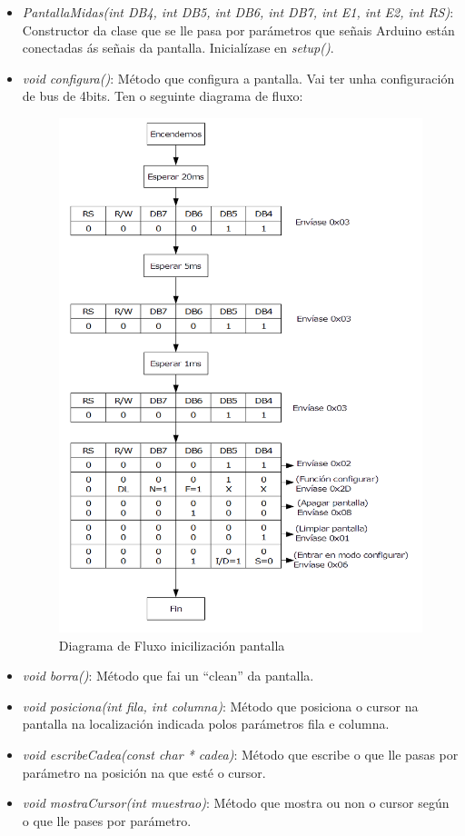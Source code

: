 \documentclass[11pt,twoside]{book}
\begin{document}
\begin{itemize}
    \item \textit{PantallaMidas(int DB4, int DB5, int DB6, int DB7, int E1, int E2, int RS)}: Constructor da clase que se lle pasa por parámetros que señais Arduino están conectadas ás señais da pantalla. Inicialízase en \textit{setup()}.
    \item \textit{void configura()}: Método que configura a pantalla. Vai ter unha configuración de bus de 4bits. Ten o seguinte diagrama de fluxo:
    \begin{figure}[H]
    	\begin{center}
    		\includegraphics[scale=0.6]{images/inicializar_lcd.png}
    	\end{center}
    	\caption{Diagrama de Fluxo inicilización pantalla}
    	\label{fig:DiagramaFlujoPantalla}
    \end{figure}
    \item \textit{void borra()}: Método que fai un ``clean'' da pantalla.
    \item \textit{void posiciona(int fila, int columna)}: Método que posiciona o cursor na pantalla na localización indicada polos parámetros fila e columna.
    \item \textit{ void escribeCadea(const char * cadea)}: Método que escribe o que lle pasas por parámetro na posición na que esté o cursor.
    \item \textit{void mostraCursor(int muestrao)}: Método que mostra ou non o cursor según o que lle pases por parámetro.
\end{itemize}
\end{document}
